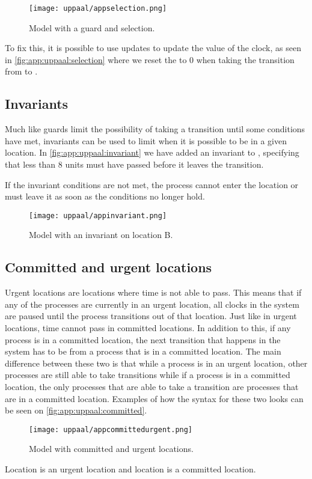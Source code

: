 \begin{figure}[H]
    \centering
    \texttt{[image: uppaal/appselection.png]}
    \caption{Model with a guard and selection.}
    \label{fig:app:uppaal:selection}
\end{figure}
\noindent
To fix this, it is possible to use updates to update the value of the clock, as seen in \autoref{fig:app:uppaal:selection} where we reset the  to 0 when taking the transition from  to .

\subsection{Invariants}
Much like guards limit the possibility of taking a transition until some conditions have met, invariants can be used to limit when it is possible to be in a given location.
In \autoref{fig:app:uppaal:invariant} we have added an invariant to , specifying that less than 8  units must have passed before it leaves the transition.

If the invariant conditions are not met, the process cannot enter the location or must leave it as soon as the conditions no longer hold.
\begin{figure}[H]
    \centering
    \texttt{[image: uppaal/appinvariant.png]}
    \caption{Model with an invariant on location B.}
    \label{fig:app:uppaal:invariant}
\end{figure}

\subsection{Committed and urgent locations}
Urgent locations are locations where time is not able to pass.
This means that if any of the processes are currently in an urgent location, all clocks in the system are paused until the process transitions out of that location.
Just like in urgent locations, time cannot pass in committed locations.
In addition to this, if any process is in a committed location, the next transition that happens in the system has to be from a process that is in a committed location. 
The main difference between these two is that while a process is in an urgent location, other processes are still able to take transitions while if a process is in a committed location, the only processes that are able to take a transition are processes that are in a committed location.
Examples of how the syntax for these two looks can be seen on \autoref{fig:app:uppaal:committed}.

\begin{figure}[H]
    \centering
    \texttt{[image: uppaal/appcommittedurgent.png]}
    \caption{Model with committed and urgent locations.}
    \label{fig:app:uppaal:committed}
\end{figure}
\noindent

Location  is an urgent location and location  is a committed location.
